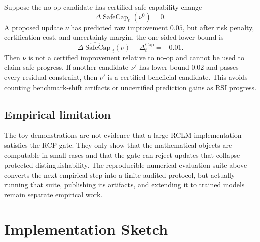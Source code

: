 \documentclass[11pt,a4paper]{article}
\providecommand{\Cap}{\operatorname{Cap}}
\newcommand{\SafeCap}{\operatorname{SafeCap}}
\begin{document}
Suppose the no-op candidate has certified safe-capability change
\[
\Delta\SafeCap_t(\nu^0)=0.
\]
A proposed update \(\nu\) has predicted raw improvement \(0.05\), but after risk penalty, certification cost, and uncertainty margin, the one-sided lower bound is
\[
\widehat{\Delta\SafeCap}_t(\nu)-\Delta_t^{\Cap}=-0.01.
\]
Then \(\nu\) is not a certified improvement relative to no-op and cannot be used to claim safe progress.  If another candidate \(\nu'\) has lower bound \(0.02\) and passes every residual constraint, then \(\nu'\) is a certified beneficial candidate.  This avoids counting benchmark-shift artifacts or uncertified prediction gains as RSI progress.

\subsection{Empirical limitation}

The toy demonstrations are not evidence that a large RCLM implementation satisfies the RCP gate.  They only show that the mathematical objects are computable in small cases and that the gate can reject updates that collapse protected distinguishability.  The reproducible numerical evaluation suite above converts the next empirical step into a finite audited protocol, but actually running that suite, publishing its artifacts, and extending it to trained models remain separate empirical work.

\section{Implementation Sketch}
\end{document}

